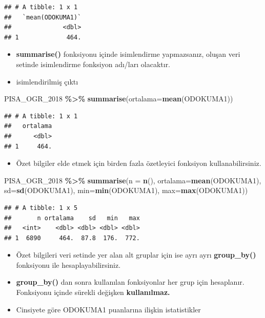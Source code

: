 \documentclass[
  oneside]{book}
\newenvironment{Shaded}{\begin{snugshade}}{\end{snugshade}}
\newcommand{\AttributeTok}[1]{\textcolor[rgb]{0.13,0.29,0.53}{#1}}
\newcommand{\FunctionTok}[1]{\textcolor[rgb]{0.13,0.29,0.53}{\textbf{#1}}}
\newcommand{\NormalTok}[1]{#1}
\newcommand{\SpecialCharTok}[1]{\textcolor[rgb]{0.81,0.36,0.00}{\textbf{#1}}}
\providecommand{\tightlist}{%
  \setlength{\itemsep}{0pt}\setlength{\parskip}{0pt}}
\begin{document}
\begin{verbatim}
## # A tibble: 1 x 1
##   `mean(ODOKUMA1)`
##              <dbl>
## 1             464.
\end{verbatim}

\begin{itemize}
\item
  \textbf{summarise()} fonksiyonu içinde isimlendirme yapmazsanız, oluşan veri setinde isimlendirme fonksiyon adı/ları olacaktır.
\item
  isimlendirilmiş çıktı
\end{itemize}

\begin{Shaded}
\begin{Highlighting}[]
\NormalTok{PISA\_OGR\_2018 }\SpecialCharTok{\%\textgreater{}\%}
  \FunctionTok{summarise}\NormalTok{(}\AttributeTok{ortalama=}\FunctionTok{mean}\NormalTok{(ODOKUMA1))}
\end{Highlighting}
\end{Shaded}

\begin{verbatim}
## # A tibble: 1 x 1
##   ortalama
##      <dbl>
## 1     464.
\end{verbatim}

\begin{itemize}
\tightlist
\item
  Özet bilgiler elde etmek için birden fazla özetleyici fonksiyon kullanabilirsiniz.
\end{itemize}

\begin{Shaded}
\begin{Highlighting}[]
\NormalTok{PISA\_OGR\_2018 }\SpecialCharTok{\%\textgreater{}\%}
  \FunctionTok{summarise}\NormalTok{(}\AttributeTok{n =} \FunctionTok{n}\NormalTok{(),}
            \AttributeTok{ortalama=}\FunctionTok{mean}\NormalTok{(ODOKUMA1),}
            \AttributeTok{sd=}\FunctionTok{sd}\NormalTok{(ODOKUMA1),}
            \AttributeTok{min=}\FunctionTok{min}\NormalTok{(ODOKUMA1),}
            \AttributeTok{max=}\FunctionTok{max}\NormalTok{(ODOKUMA1))}
\end{Highlighting}
\end{Shaded}

\begin{verbatim}
## # A tibble: 1 x 5
##       n ortalama    sd   min   max
##   <int>    <dbl> <dbl> <dbl> <dbl>
## 1  6890     464.  87.8  176.  772.
\end{verbatim}

\begin{itemize}
\item
  Özet bilgileri veri setinde yer alan alt gruplar için ise ayrı ayrı \textbf{group\_by()} fonksiyonu ile hesaplayabilirsiniz.
\item
  \textbf{group\_by()} dan sonra kullanılan fonksiyonlar her grup için hesaplanır. Fonksiyonu içinde sürekli değişken \textbf{kullanılmaz.}
\item
  Cinsiyete göre ODOKUMA1 puanlarına ilişkin istatistikler
\end{itemize}
\end{document}
